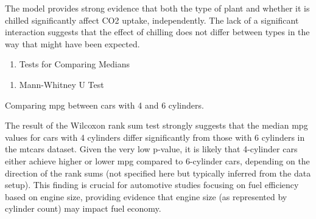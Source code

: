 \documentclass[
]{book}
\newenvironment{Shaded}{\begin{snugshade}}{\end{snugshade}}
\newcommand{\CommentTok}[1]{\textcolor[rgb]{0.56,0.35,0.01}{\textit{#1}}}
\newcommand{\DecValTok}[1]{\textcolor[rgb]{0.00,0.00,0.81}{#1}}
\newcommand{\FunctionTok}[1]{\textcolor[rgb]{0.13,0.29,0.53}{\textbf{#1}}}
\newcommand{\NormalTok}[1]{#1}
\newcommand{\OtherTok}[1]{\textcolor[rgb]{0.56,0.35,0.01}{#1}}
\newcommand{\SpecialCharTok}[1]{\textcolor[rgb]{0.81,0.36,0.00}{\textbf{#1}}}
\providecommand{\tightlist}{%
  \setlength{\itemsep}{0pt}\setlength{\parskip}{0pt}}
\begin{document}
The model provides strong evidence that both the type of plant and whether it is chilled significantly affect CO2 uptake, independently. The lack of a significant interaction suggests that the effect of chilling does not differ between types in the way that might have been expected.

\begin{enumerate}
\def\labelenumi{\arabic{enumi}.}
\setcounter{enumi}{1}
\tightlist
\item
  Tests for Comparing Medians
\end{enumerate}

\begin{enumerate}
\def\labelenumi{\alph{enumi}.}
\tightlist
\item
  Mann-Whitney U Test
\end{enumerate}

Comparing mpg between cars with 4 and 6 cylinders.

\begin{Shaded}
\end{Shaded}

The result of the Wilcoxon rank sum test strongly suggests that the median mpg values for cars with 4 cylinders differ significantly from those with 6 cylinders in the mtcars dataset. Given the very low p-value, it is likely that 4-cylinder cars either achieve higher or lower mpg compared to 6-cylinder cars, depending on the direction of the rank sums (not specified here but typically inferred from the data setup). This finding is crucial for automotive studies focusing on fuel efficiency based on engine size, providing evidence that engine size (as represented by cylinder count) may impact fuel economy.
\end{document}
